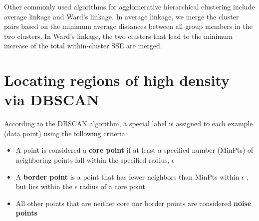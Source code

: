 
\begin{tcolorbox}[title=Alternative types of linkages]

    Other commonly used algorithms for agglomerative hierarchical clustering include average linkage and Ward’s linkage. In average linkage, we merge the cluster pairs based on the minimum average distances between all group members in the two clusters. In Ward’s linkage, the two clusters that lead to the minimum increase of the total within-cluster SSE are merged.
\end{tcolorbox}
\section{Locating regions of high density via DBSCAN}
According to the DBSCAN algorithm, a special label is assigned to each example (data point) using the following criteria:

\begin{itemize}
    \item A point is considered a \textbf{core point} if at least a specified number (MinPts) of neighboring points fall within the specified radius, $\epsilon$
    \item A \textbf{border point} is a point that has fewer neighbors than MinPts within $\epsilon$ , but lies within the $\epsilon$ radius of a core point
    \item All other points that are neither core nor border points are considered \textbf{noise points}
\end{itemize}
